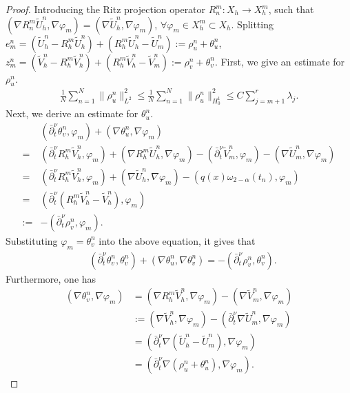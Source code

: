 \documentclass[10pt,a4paper]{amsart}
\begin{document}
\begin{proof}
Introducing the Ritz projection operator $R_n^m:X_h\rightarrow X_h^m$, such that $(\nabla R_n^m \widetilde{U}_h^n, \nabla \varphi_m)=(\nabla \widetilde{U}_h^n, \nabla \varphi_m)$, $\forall \varphi_m\in X_h^m\subset X_h$.  Splitting $e_m^n=(\widetilde{U}_h^n-R_h^m\widetilde{U}_h^n)+(R_h^m\widetilde{U}_h^n-\widetilde{U}_m^n):=\rho_u^n+\theta_u^n$, $z_m^n=(\widetilde{V}_h^n-R_h^m\widetilde{V}_h^n)+(R_h^m\widetilde{V}_h^n-\widetilde{V}_m^n):=\rho_v^n+\theta_v^n$. 
First, we give an estimate for $\rho_u^n$.
\begin{align}\label{pod-1}
\frac{1}{N}\sum_{n=1}^N\|\rho_u^n\|_{L^2}^2\leq \frac{1}{N}\sum_{n=1}^N\|\rho_u^n\|_{H_0^1}^2\leq C\sum_{j=m+1}^r\lambda_j.    
\end{align}
Next, we derive an estimate for $\theta_u^n$.
\begin{align*}
&(\bar\partial_t^\nu\theta_v^n,\varphi_m)+(\nabla\theta_u^n,\nabla\varphi_m)\\
=&(\bar\partial_t^\nu R_h^m\widetilde{V}_h^n,\varphi_m)+(\nabla R_h^m\widetilde{U}_h^n,\nabla\varphi_m)-(\bar\partial_t^\nu \widetilde{V}_m^n,\varphi_m)-(\nabla \widetilde{U}_m^n,\nabla\varphi_m)\\
=&(\bar\partial_t^\nu R_h^m\widetilde{V}_h^n,\varphi_m)+(\nabla \widetilde{U}_h^n,\nabla\varphi_m)-(q(x)\omega_{2-\alpha}(t_n),\varphi_m)\\
=&(\bar\partial_t^\nu (R_h^m\widetilde{V}_h^n-\widetilde{V}_h^n),\varphi_m)\\
:=&-(\bar\partial_t^\nu \rho_v^n,\varphi_m).
\end{align*}
Substituting $\varphi_m=\theta_v^n$ into the above equation, it gives that
\begin{align}\label{pod-2}
&(\bar\partial_t^\nu\theta_v^n,\theta_v^n)+(\nabla\theta_u^n,\nabla\theta_v^n)=-(\bar\partial_t^\nu \rho_v^n,\theta_v^n).
\end{align}
Furthermore, one has
\begin{align*}
(\nabla \theta_v^n,\nabla\varphi_m)
&=(\nabla R_h^m\widetilde{V}_h^n,\nabla\varphi_m)-(\nabla \widetilde{V}_m^n,\nabla\varphi_m)\\
&:=(\nabla \widetilde{V}_h^n,\nabla\varphi_m)-(\bar\partial_t^\nu \nabla\widetilde{U}_m^n,\nabla\varphi_m)\\
&=(\bar\partial_t^\nu \nabla(\widetilde{U}_h^n-\widetilde{U}_m^n),\nabla\varphi_m)\\
&=(\bar\partial_t^\nu \nabla (\rho_u^n+\theta_u^n),\nabla\varphi_m).
\end{align*}

\end{proof}
\end{document}
